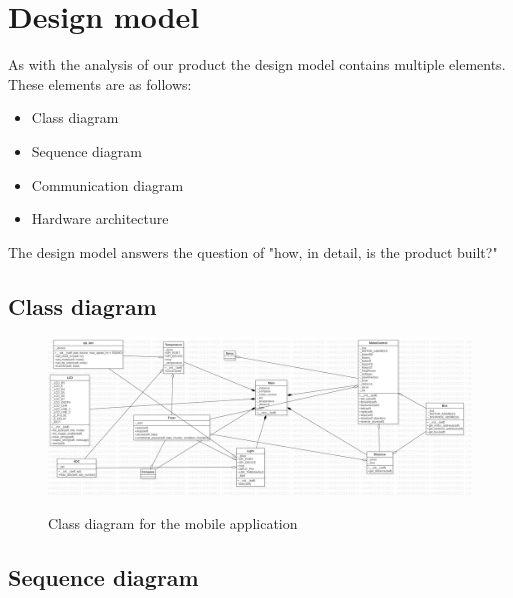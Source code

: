 \documentclass[12pt]{article}
\begin{document}
 	\section{Design model}
 	As with the analysis of our product the design model contains multiple elements. These elements are as follows:
 	\begin{itemize}
 		\item Class diagram
 		\item Sequence diagram
 		\item Communication diagram
 		\item Hardware architecture
 	\end{itemize}
 	The design model answers the question of "how, in detail, is the product built?"
 	\subsection{Class diagram}
 		\begin{figure}[H]
 		\centering
 		\includegraphics[width=\linewidth]{MobileClassDiagram.png}\\
 		\caption{Class diagram for the mobile application}
 		\end{figure}
 	\subsection{Sequence diagram}
\end{document}
